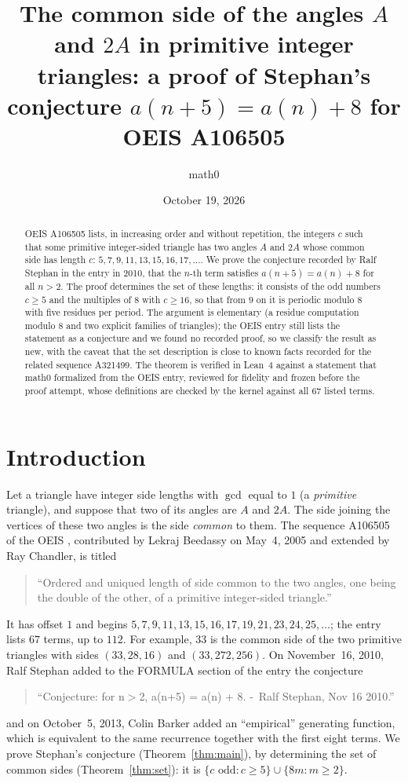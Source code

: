 \documentclass[11pt]{amsart}
\title[The common side of the angles $A$ and $2A$]{The common side of the angles $A$ and $2A$ in primitive integer triangles: a proof of Stephan's conjecture $a(n+5)=a(n)+8$ for OEIS A106505}
\author{math0}
\date{October 19, 2026}
\theoremstyle{plain}
\theoremstyle{definition}
\begin{document}
\begin{abstract}
OEIS A106505 lists, in increasing order and without repetition, the integers $c$ such that some primitive integer-sided triangle has two angles $A$ and $2A$ whose common side has length $c$: $5,7,9,11,13,15,16,17,\dots$.
We prove the conjecture recorded by Ralf Stephan in the entry in 2010, that the $n$-th term satisfies $a(n+5)=a(n)+8$ for all $n>2$.
The proof determines the set of these lengths: it consists of the odd numbers $c\ge5$ and the multiples of $8$ with $c\ge16$, so that from $9$ on it is periodic modulo $8$ with five residues per period. The argument is elementary (a residue computation modulo $8$ and two explicit families of triangles); the OEIS entry still lists the statement as a conjecture and we found no recorded proof, so we classify the result as new, with the caveat that the set description is close to known facts recorded for the related sequence A321499.
The theorem is verified in Lean~4 against a statement that math0 formalized from the OEIS entry, reviewed for fidelity and frozen before the proof attempt, whose definitions are checked by the kernel against all $67$ listed terms.
\end{abstract}
\maketitle

\section{Introduction}

Let a triangle have integer side lengths with $\gcd$ equal to $1$ (a \emph{primitive} triangle), and suppose that two of its angles are $A$ and $2A$. The side joining the vertices of these two angles is the side \emph{common} to them. The sequence A106505 of the OEIS \cite{A106505}, contributed by Lekraj Beedassy on May~4, 2005 and extended by Ray Chandler, is titled
\begin{quote}
``Ordered and uniqued length of side common to the two angles, one being the double of the other, of a primitive integer-sided triangle.''
\end{quote}
It has offset $1$ and begins $5,7,9,11,13,15,16,17,19,21,23,24,25,\dots$; the entry lists $67$ terms, up to $112$. For example, $33$ is the common side of the two primitive triangles with sides $(33,28,16)$ and $(33,272,256)$. On November~16, 2010, Ralf Stephan added to the FORMULA section of the entry the conjecture
\begin{quote}
``Conjecture: for n$>$2, a(n+5) = a(n) + 8. -{}~Ralf Stephan, Nov 16 2010.''
\end{quote}
and on October~5, 2013, Colin Barker added an ``empirical'' generating function, which is equivalent to the same recurrence together with the first eight terms. We prove Stephan's conjecture (Theorem~\ref{thm:main}), by determining the set of common sides (Theorem~\ref{thm:set}): it is $\{c \text{ odd}: c\ge 5\}\cup\{8m: m\ge2\}$.
\end{document}
